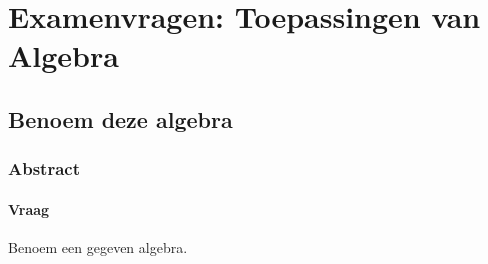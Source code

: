\documentclass[main.tex]{subfiles}
\begin{document}
\chapter{Examenvragen: Toepassingen van Algebra}
\label{cha:examen-tai}

\section{Benoem deze algebra}
\subsection{Abstract}

\subsubsection{Vraag}
\begin{center}
  Benoem een gegeven algebra.
\end{center}
\end{document}
